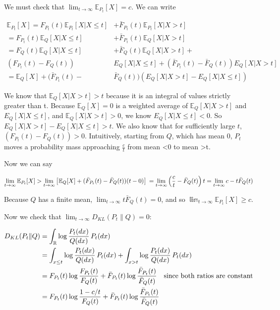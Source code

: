 \documentclass{article}
\begin{document}
We must check that \(\lim_{t \to \infty} \mathbb E_{P_t}[X] = c\). We
can write

\begin{align*} \mathbb E_{P_t}[X] = F_{P_t}(t) \mathbb E_{P_t}[X | X \le t] &+ \bar F_{P_t}(t) \mathbb E_{P_t}[X | X > t]    \\ = F_{P_t}(t) \mathbb E_Q[X | X \le t] &+ \bar F_{P_t}(t) \mathbb E_Q[X | X > t]    \\ = F_Q(t) \mathbb E_Q[X | X \le t] &+ \bar F_Q(t) \mathbb E_Q[X | X > t] + \\ (F_{P_t}(t) - F_Q(t))&E_Q[X | X \le t] + (\bar F_{P_t}(t) - \bar F_Q(t)) E_Q[X | X > t]     \\ = \mathbb E_Q[X] + (\bar F_{P_t}(t) - &\bar F_Q(t))(E_Q[X | X > t] - E_Q[X | X \le t])
\end{align*}

We know that \(\mathbb E_Q[X | X > t] > t\) because it is an integral of
values strictly greater than t. Because \(\mathbb E_Q[X] = 0\) is a
weighted average of \(\mathbb E_Q[X|X>t]\) and \(E_Q[X | X \le t]\), and
\(\mathbb E_Q[X|X>t] > 0\), we know \(E_Q[X | X \le t] < 0\). So
\(E_Q[X | X > t] - E_Q[X | X \le t] > t.\) We also know that for
sufficiently large \(t\), \((F_{P_t}(t) - F_Q(t)) > 0\). Intuitively,
starting from \(Q\), which has mean 0, \(P_t\) moves a probability mass
approaching \(\frac c t\) from mean \textless0 to mean \textgreater t.

Now we can say

\[
\lim_{t \to \infty} \mathbb E_{P_t}[X] > \lim_{t \to \infty}\left[ \mathbb E_Q[X] + (\bar F_{P_t}(t) - \bar F_Q(t))(t-0) \right]
\\ = \lim_{t \to \infty}\left( \frac c t - \bar F_Q(t) \right) t = \lim_{t \to \infty}c - t \bar F_Q(t)
\]

Because \(Q\) has a finite mean,
\(\lim_{t \to \infty} t \bar F_Q(t) = 0\), and so
\(\mathbb \lim_{t \to \infty} \mathbb E_{P_t}[X] \ge c\).

Now we check that \(\lim_{t \to \infty} D_{KL}(P_t \| Q) = 0\):

\begin{align*}D_{KL}({P_t} \| Q) &= \int_{\mathbb R} \log \frac{{P_t}(dx)}{Q(dx)} \,{P_t}(dx)\\&= \int_{x \le t} \log \frac{{P_t}(dx)}{Q(dx)} \,{P_t}(dx) + \int_{x > t} \log \frac{{P_t}(dx)}{Q(dx)} \,{P_t}(dx)\\ &= F_{P_t}(t) \log \frac{F_{P_t}(t)}{F_Q(t)} + \bar F_{P_t}(t) \log \frac{\bar F_{P_t}(t)}{\bar F_Q(t)} \text{\quad since both ratios are constant}\\ &= F_{P_t}(t) \log \frac{1 - c/t}{F_Q(t)} + \bar F_{P_t}(t) \log \frac{\bar F_{P_t}(t)}{\bar F_Q(t)}\end{align*}
\end{document}
